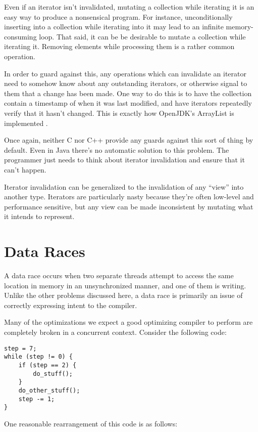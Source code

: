 Even if an iterator isn't invalidated, mutating a collection
while iterating it is an easy way to produce a nonsensical program. For instance,
unconditionally inserting into a collection while iterating into it may lead
to an infinite memory-consuming loop. That said, it can be be desirable to
mutate a collection while iterating it. Removing elements while processing them
is a rather common operation.

In order to guard against this, any operations which can invalidate an iterator
need to somehow know about any outstanding iterators, or otherwise signal to
them that a change has been made. One way to do this is to have the
collection contain a timestamp of when it was last modified, and have iterators
repeatedly verify that it hasn't changed. This is exactly how OpenJDK's ArrayList is
implemented \cite{jdkiter}.

Once again, neither C nor C++ provide any guards against this sort of thing
by default. Even in Java there's no automatic solution to this problem. The
programmer just needs to think about iterator invalidation and ensure that it
can't happen.

Iterator invalidation can be generalized to the invalidation of any ``view''
into another type. Iterators are particularly nasty because they're often
low-level and performance sensitive, but any view can be made
inconsistent by mutating what it intends to represent.






\section{Data Races}

A data race occurs when two separate threads attempt to access the same location
in memory in an unsynchronized manner, and one of them is writing. Unlike the
other problems discussed here, a data race is primarily an issue of correctly
expressing intent to the compiler.

Many of the optimizations we expect a good optimizing compiler to perform are
completely broken in a concurrent context. Consider the following code:

\begin{verbatim}
step = 7;
while (step != 0) {
    if (step == 2) {
        do_stuff();
    }
    do_other_stuff();
    step -= 1;
}
\end{verbatim}

One reasonable rearrangement of this code is as follows:

